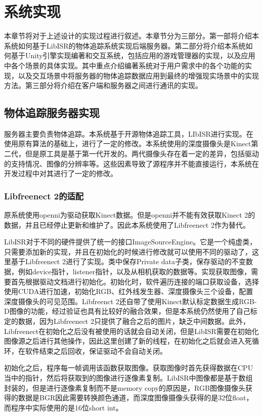 \chapter{系统实现}
\label{implement}

本章节将对于上述设计的实现过程进行叙述。本章节分为三部分。第一部将介绍本系统如何基于LibISR的物体追踪系统\cite{Ren_3DV_2014, star3d_iccv_2013}实现后端服务器。第二部分将介绍本系统如何基于Unity引擎实现编著和交互系统，包括应用的游戏管理器的实现，以及应用中各个场景的具体实现。其中重点介绍编著系统对于用户需求中的各个功能的实现，以及交互场景中将服务器的物体追踪数据应用到最终的增强现实场景中的实现方法。第三部分将介绍在客户端和服务器之间进行通讯的实现。

\section{物体追踪服务器实现}
服务器主要负责物体追踪。本系统基于开源物体追踪工具，LIbISR进行实现。在使用原有算法的基础上，进行了一定的修改。本系统使用的深度摄像头是Kinect第二代，但是原工具是基于第一代开发的。两代摄像头存在着一定的差异，包括驱动的支持情况、图像的分辨率等。这些因素导致了源程序并不能直接运行，本系统在开发过程中对其进行了一定的修改。

\subsection{Libfreenect 2的适配}

原系统使用openni为驱动获取Kinect数据。但是openni并不能有效获取Kinect 2的数据，并且已经停止更新和维护了。因此本系统使用了Libfreenect 2作为替代。

LibISR对于不同的硬件提供了统一的接口ImageSourceEngine。它是一个纯虚类，只需要添加新的实现，并且在初始化的时候进行修改就可以使用不同的驱动了，这里基于Libfreenect 2进行了实现。类中保存Private data子类，保存驱动的不变数据，例如device指针，listener指针，以及从相机获取的数据等。实现获取图像，需要首先根据驱动文档进行初始化。初始化时，软件遍历连接的端口获取设备，选择使用CUDA进行加速，初始化RGB、红外线发生器、深度摄像头三个设备，配置深度摄像头的可见范围。Libfreenct 2还自带了使用Kinect默认标定数据生成RGB-D图像的功能，经过验证也具有比较好的融合效果，但是本系统仍然使用了自己标定的数据，因为Libfreenect 2只提供了融合之后的图片，缺乏中间数据。此外，Libfreenect在初始化之后没有被使用的话就会自动关闭，但是LibISR需要在初始化图像源之后进行其他操作，因此这里创建了新的线程，在初始化之后就会进入死循环，在软件结束之后回收，保证驱动不会自动关闭。

初始化之后，程序每一帧调用该函数获取图像。获取图像时首先获得数据在CPU当中的指针，然后将获取到的图像进行逐像素复制。LibISR中图像都是基于数组封装的，但是进行逐像素复制而不是memory copy的原因是，RGB图像摄像头获得的数据是BGR因此需要转换颜色通道，而深度图像摄像头获得的是32位float，而程序中实际使用的是16位short int。

